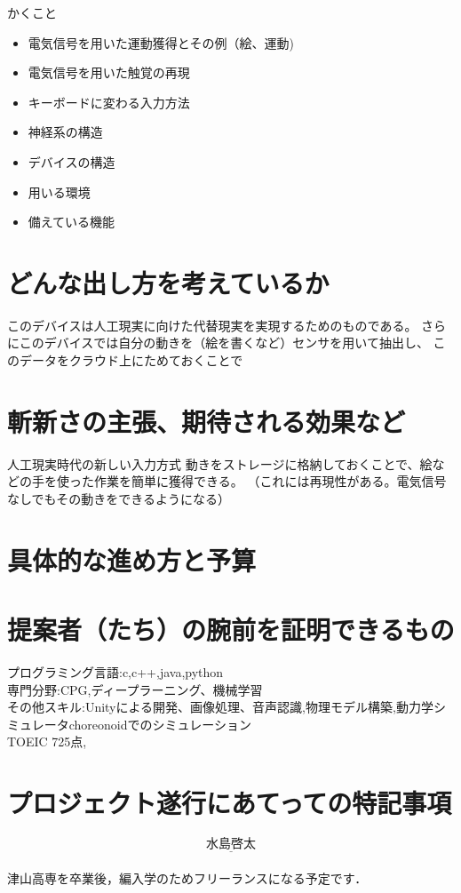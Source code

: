 \documentclass[11pt,onecolumn]{jsarticle}
\begin{document}
かくこと
\begin{itemize}
 \item 電気信号を用いた運動獲得とその例（絵、運動)
 \item 電気信号を用いた触覚の再現
 \item キーボードに変わる入力方法
 \item 神経系の構造
 \item デバイスの構造
 \item 用いる環境
 \item 備えている機能
\end{itemize}

\section{どんな出し方を考えているか}
このデバイスは人工現実に向けた代替現実を実現するためのものである。
さらにこのデバイスでは自分の動きを（絵を書くなど）センサを用いて抽出し、
このデータをクラウド上にためておくことで

\section{斬新さの主張、期待される効果など}
人工現実時代の新しい入力方式
動きをストレージに格納しておくことで、絵などの手を使った作業を簡単に獲得できる。
（これには再現性がある。電気信号なしでもその動きをできるようになる）



\section{具体的な進め方と予算}


\section{提案者（たち）の腕前を証明できるもの}
プログラミング言語:c,c++,java,python\\
専門分野:CPG,ディープラーニング、機械学習\\
その他スキル:Unityによる開発、画像処理、音声認識,物理モデル構築,動力学シミュレータchoreonoidでのシミュレーション\\
TOEIC 725点,


\section{プロジェクト遂行にあてっての特記事項}
\[
  \underline{水島啓太}
\]\\
津山高専を卒業後，編入学のためフリーランスになる予定です．
\end{document}
